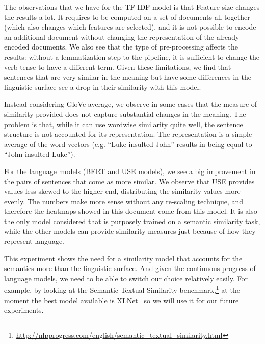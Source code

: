 The observations that we have for the TF-IDF model is that
Feature size changes the results a lot.
It requires to be computed on a set of documents all together (which also changes which features are selected), and it is not possible to encode an additional document without changing the representation of the already encoded documents.
We also see that the type of pre-processing affects the results: without a lemmatization step to the pipeline, it is sufficient to change the verb tense to have a different term.
Given these limitations, we find that sentences that are very similar in the meaning but have some differences in the linguistic surface see a drop in their similarity with this model.

Instead considering GloVe-average, we observe in some cases that the measure of similarity provided does not capture substantial changes in the meaning. The problem is that, while it can use wordwise similarity quite well, the sentence structure is not accounted for its representation. The representation is a simple average of the word vectors (e.g. ``Luke insulted John'' results in being equal to ``John insulted Luke'').

For the language models (BERT and USE models), we see a big improvement in the pairs of sentences that come as more similar.
We observe that USE provides values less skewed to the higher end, distributing the similarity values more evenly. The numbers make more sense without any re-scaling technique, and therefore the heatmaps showed in this document come from this model.
It is also the only model considered that is purposely trained on a semantic similarity task, while the other models can provide similarity measures just because of how they represent language.



This experiment shows the need for a similarity model that accounts for the semantics more than the linguistic surface. And given the continuous progress of language models, we need to be able to switch our choice relatively easily.
For example, by looking at the Semantic Textual Similarity benchmark,\footnote{\url{http://nlpprogress.com/english/semantic_textual_similarity.html}} at the moment the best model available is XLNet~\cite{yang2019xlnet} so we will use it for our future experiments.

